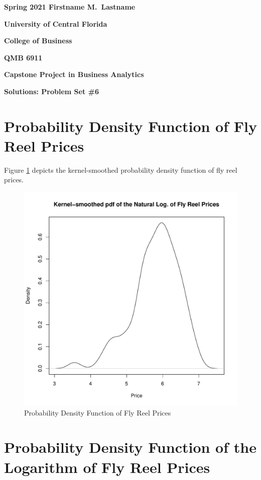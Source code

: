 \documentclass[11pt]{book}
\begin{document}

\pagestyle{empty}
{\noindent\bf Spring 2021 \hfill Firstname M.~Lastname}
\vskip 16pt
\centerline{\bf University of Central Florida}
\centerline{\bf College of Business}
\vskip 16pt
\centerline{\bf QMB 6911}
\centerline{\bf Capstone Project in Business Analytics}
\vskip 10pt
\centerline{\bf Solutions:  Problem Set \#6}
\vskip 32pt
\noindent




\pagebreak
\section*{Probability Density Function of Fly Reel Prices}

Figure \ref{fig:density_prices} depicts
the kernel-smoothed probability density function of fly reel
prices.

\begin{figure}[h!]
  \centering
  \includegraphics[scale = 0.5, keepaspectratio=true]{../Figures/density_prices}
  \caption{Probability Density Function of Fly Reel Prices} \label{fig:density_prices}
\end{figure}



\pagebreak
\section*{Probability Density Function of the Logarithm of Fly Reel Prices}
\end{document}
